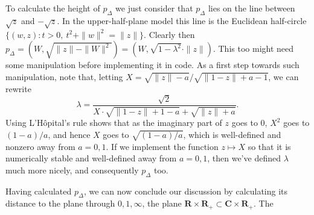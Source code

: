 \documentclass{amsart}
\theoremstyle{plain}
\begin{document}
To calculate the height of $p_\Delta$ we
just consider that $p_\Delta$ lies on the
line between $\sqrt{z}$ and $-\sqrt{z}$.
In the upper-half-plane model this line is
the Euclidean half-circle
$\{(w,z) : t>0,\ t^2 + \|w\|^2 = \|z\|\}$.
Clearly then $p_\Delta = (W, \sqrt{\|z\| - \|W\|^2}) = (W, \sqrt{1-\lambda^2}\cdot\|z\|)$.
This too might need some manipulation
before implementing it in code. As a
first step towards such manipulation,
note that, letting 
$X = \sqrt{\|z\|-a}/\sqrt{\|1-z\| + a-1}$, we can rewrite
\begin{equation}\label{eqn:lmb}
\lambda = \frac{\sqrt{2}}
            {X\cdot \sqrt{\|1-z\|+1-a}
             +\sqrt{\|z\|+a}}.
\end{equation}
Using L'H\^{o}pital's rule shows that as the
imaginary part of $z$ goes to 0, $X^2$ goes
to $(1-a)/a$, and hence $X$ goes to $\sqrt{(1-a)/a}$,
which is well-defined and nonzero away from $a = 0, 1$.
If we implement the function $z \mapsto X$ so that
it is numerically stable and well-defined away
from $a = 0,1$, then we've defined $\lambda$ much
more nicely, and consequently $p_\Delta$ too.



Having calculated $p_\Delta$, we can
now conclude our discussion by calculating
its distance to the plane through $0,1,\infty$,
the plane $\mathbf{R} \times \mathbf{R}_+ \subset \mathbf{C} \times \mathbf{R}_+$.
The 
\end{document}
